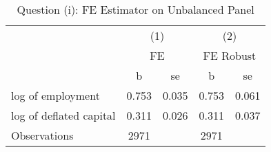 \begin{table}[htbp]\centering
\def\sym#1{\ifmmode^{#1}\else\(^{#1}\)\fi}
\caption{Question (i): FE Estimator on Unbalanced Panel}
\begin{tabular}{l*{2}{cc}}
\toprule
                    &\multicolumn{2}{c}{(1)}  &\multicolumn{2}{c}{(2)}  \\
                    &\multicolumn{2}{c}{FE}   &\multicolumn{2}{c}{FE Robust}\\
                    &           b&          se&           b&          se\\
\midrule
log of employment   &       0.753&       0.035&       0.753&       0.061\\
log of deflated capital&       0.311&       0.026&       0.311&       0.037\\
\midrule
Observations        &        2971&            &        2971&            \\
\bottomrule
\end{tabular}
\end{table}
